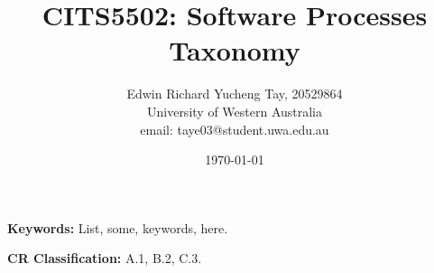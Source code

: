\documentclass[12pt, a4paper, titlepage]{article}
\title{CITS5502: Software Processes Taxonomy}
\author{Edwin Richard Yucheng Tay, 20529864 \\
University of Western Australia \\
email: taye03@student.uwa.edu.au }
\date{\today}
\begin{document}
\maketitle



{\bf Keywords:} List, some, keywords, here.

{\bf CR Classification:} A.1, B.2, C.3.

\pagebreak

\tableofcontents









\appendix





\end{document}
